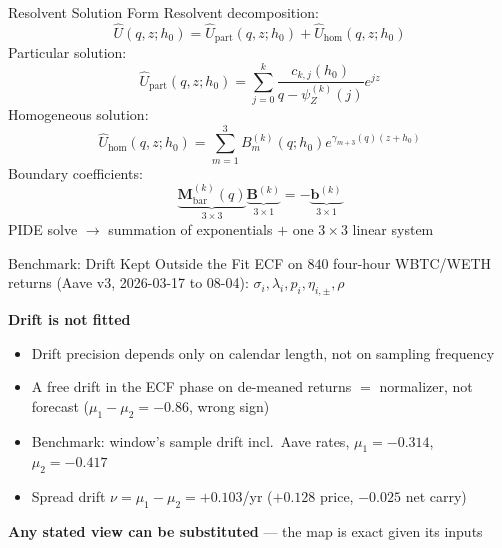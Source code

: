 \documentclass[aspectratio=169,10pt]{beamer}
\begin{document}
\begin{frame}{Resolvent Solution Form}
  \small
  Resolvent decomposition:
  \[
    \widehat U(q,z;h_0)
    =
    \widehat U_{\mathrm{part}}(q,z;h_0)
    +
    \widehat U_{\mathrm{hom}}(q,z;h_0)
  \]
  Particular solution:
  \[
    \widehat U_{\mathrm{part}}(q,z;h_0)
    =
    \sum_{j=0}^{k}
    \frac{c_{k,j}(h_0)}{q-\psi_Z^{(k)}(j)}e^{jz}
  \]
  Homogeneous solution:
  \[
    \widehat U_{\mathrm{hom}}(q,z;h_0)
    =
    \sum_{m=1}^{3}
    B_m^{(k)}(q;h_0)e^{\gamma_{m+3}(q)(z+h_0)}
  \]
  Boundary coefficients:
  \[
    \underbrace{\mathbf M_{\mathrm{bar}}^{(k)}(q)}_{3\times3}
    \underbrace{\mathbf B^{(k)}}_{3\times1}
    =
    -\underbrace{\mathbf b^{(k)}}_{3\times1}
  \]
  PIDE solve $\rightarrow$ summation of exponentials $+$ one $3\times3$ linear system
\end{frame}

\begin{frame}{Benchmark: Drift Kept Outside the Fit}
  \small
  ECF on $840$ four-hour WBTC/WETH returns (Aave v3, 2026-03-17 to 08-04): $\sigma_i,\lambda_i,p_i,\eta_{i,\pm},\rho$
  \vspace{0.3em}

  \textbf{Drift is not fitted}
  \begin{itemize}
    \item Drift precision depends only on calendar length, not on sampling frequency
    \item A free drift in the ECF phase on de-meaned returns $=$ normalizer, not forecast ($\mu_1-\mu_2=-0.86$, wrong sign)
    \item Benchmark: window's sample drift incl.\ Aave rates, $\mu_1=-0.314$, $\mu_2=-0.417$
    \item Spread drift $\nu=\mu_1-\mu_2=+0.103$/yr ($+0.128$ price, $-0.025$ net carry)
  \end{itemize}
  \vspace{0.3em}
  \textbf{Any stated view can be substituted} --- the map is exact given its inputs
\end{frame}
\end{document}

